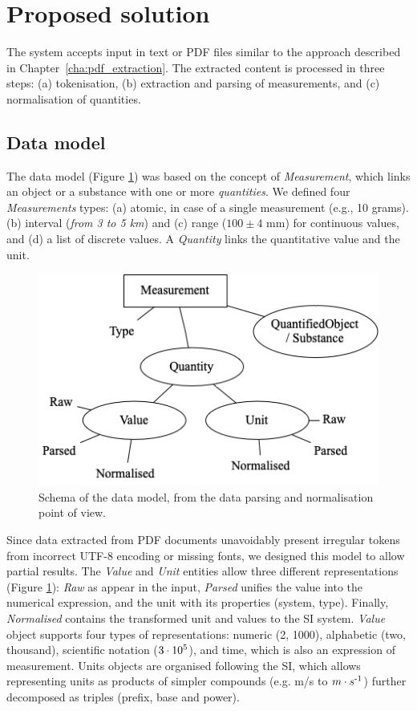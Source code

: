 \section{Proposed solution}
\label{sec:system}

The system accepts input in text or PDF files similar to the approach described in Chapter~\ref{cha:pdf_extraction}. 
The extracted content is processed in three steps: (a) tokenisation, (b) extraction and parsing of measurements, and (c) normalisation of quantities.

\subsection{Data model}
\label{subsec:data-model}

The data model (Figure \ref{fig:data-model-schema-2}) was based on the concept of \textit{Measurement}, which links an object or a substance with one or more \textit{quantities}. 
We defined four \textit{Measurements} types: (a) atomic, in case of a single measurement (e.g., 10 grams). (b) interval (\textit{from 3 to 5 km}) and (c) range ($100 \pm 4$ mm) for continuous values, and (d) a list of discrete values. A \textit{Quantity} links the quantitative value and the unit. 

\label{subsub:data-model}
\begin{figure}[htbp]
  \centering
  \includegraphics[width=0.8\linewidth]{figures/quantities/schema-2.png}
  \caption{Schema of the data model, from the data parsing and normalisation point of view.}
  \label{fig:data-model-schema-2}
\end{figure}

Since data extracted from PDF documents unavoidably present irregular tokens from incorrect UTF-8 encoding or missing fonts, we designed this model to allow partial results. 
The \textit{Value} and \textit{Unit} entities allow three different representations (Figure \ref{fig:data-model-schema-2}): \textit{Raw} as appear in the input, \textit{Parsed} unifies the value into the numerical expression, and the unit with its properties (system, type). Finally, \textit{Normalised} contains the transformed unit and values to the SI system. \textit{Value} object supports four types of representations: numeric (2, 1000), alphabetic (two, thousand), scientific notation ($3\cdot10\textsuperscript{5}$), and time, which is also an expression of measurement. Units objects are organised following the SI, which allows representing units as products of simpler compounds (e.g. m/s to $m \cdot s\textsuperscript{-1}$) further decomposed as triples (prefix, base and power).


